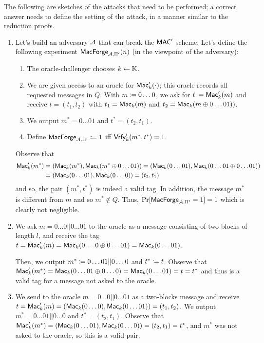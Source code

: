 \begin{solution}
	The following are sketches of the attacks that need to be performed; a correct answer needs to define the setting of the attack, in a manner similar to the reduction proofs.
	\begin{enumerate}
		\item Let's build an adversary $\mathcal{A}$ that can break the $\mathsf{MAC}'$ scheme. Let's define the following experiment $\mathsf{MacForge}_{\mathcal{A},\Pi'}(n)$ (in the viewpoint of the adversary):
		\begin{enumerate}[label=(\arabic*)]
			\item The oracle-challenger chooses $k \leftarrow \mathbb{K}$.
			\item We are given access to an oracle for $\operatorname{\mathsf{Mac}}'_k(\cdot)$; this oracle records all requested messages in $Q$. With $m \coloneqq 0\dots0$, we ask for $t \coloneqq \operatorname{\mathsf{Mac}}'_k(m)$ and receive $t=(t_1, t_2)$ with $t_1=\operatorname{\mathsf{Mac}}_k(m)$ and $t_2=\operatorname{\mathsf{Mac}}_k(m \oplus 0\dots01))$.
			\item We output $m^*=0\dots01$ and $t^*=(t_2, t_1)$.
			\item Define $\mathsf{MacForge}_{\mathcal{A},\Pi'} \coloneqq 1$ iff $\operatorname{\mathsf{Vrfy}}'_k(m^*, t^*) = 1$.
		\end{enumerate}
	Observe that
	\begin{align*}
	\operatorname{\mathsf{Mac}}'_k(m^*) &= (\operatorname{\mathsf{Mac}}_k(m^*), \operatorname{\mathsf{Mac}}_k(m^* \oplus 0\dots01)) = (\operatorname{\mathsf{Mac}}_k(0\dots01), \operatorname{\mathsf{Mac}}_k(0\dots01 \oplus 0\dots01)) \\
	&= (\operatorname{\mathsf{Mac}}_k(0\dots01), \operatorname{\mathsf{Mac}}_k(0\dots0)) = (t_2, t_1)
	\end{align*}
	and so, the pair $(m^*, t^*)$ is indeed a valid tag. In addition, the message $m^*$ is different from $m$ and so $m^*\not\in Q$.
	Thus, $\Pr[\mathsf{MacForge}_{\mathcal{A},\Pi'}=1] = 1$ which is clearly not negligible.

	\item We ask $m=0\dots0||0\dots01$ to the oracle as a message consisting of two blocks of length $l$, and receive the tag $t=\operatorname{\mathsf{Mac}}'_k(m)=\operatorname{\mathsf{Mac}}_k(0\dots0 \oplus 0\dots01) = \operatorname{\mathsf{Mac}}_k(0\dots01)$.

	Then, we output $m^* \coloneqq 0\dots01||0\dots0$ and $t^* \coloneqq t$. Observe that $\operatorname{\mathsf{Mac}}'_k(m^*)=\operatorname{\mathsf{Mac}}_k(0\dots01 \oplus 0\dots0)=\operatorname{\mathsf{Mac}}_k(0\dots01)=t=t^*$ and thus is a valid tag for a message not asked to the oracle.

	\item We send to the oracle $m=0\dots0||0\dots01$ as a two-blocks message and receive $t=\operatorname{\mathsf{Mac}}'_k(m)=(\operatorname{\mathsf{Mac}}_k(0\dots0), \operatorname{\mathsf{Mac}}_k(0\dots01))=(t_1, t_2)$. We output $m^*=0\dots01||0\dots0$ and $t^*=(t_2, t_1)$. Observe that $\operatorname{\mathsf{Mac}}'_k(m^*)=(\operatorname{\mathsf{Mac}}_k(0\dots01), \operatorname{\mathsf{Mac}}_k(0\dots0))=(t_2, t_1)=t^*$, and $m^*$ was not asked to the oracle, so this is a valid pair.


\end{enumerate}
\end{solution}
